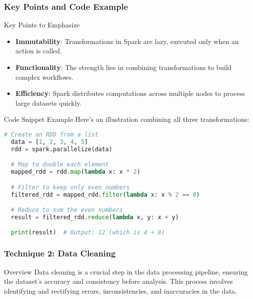\documentclass[aspectratio=169]{beamer}
\begin{document}
\begin{frame}[fragile]
  \frametitle{Key Points and Code Example}

  \begin{block}{Key Points to Emphasize}
    \begin{itemize}
      \item \textbf{Immutability}: Transformations in Spark are lazy, executed only when an action is called. 
      \item \textbf{Functionality}: The strength lies in combining transformations to build complex workflows.
      \item \textbf{Efficiency}: Spark distributes computations across multiple nodes to process large datasets quickly.
    \end{itemize}
  \end{block}

  \begin{block}{Code Snippet Example}
  Here’s an illustration combining all three transformations:
  \begin{lstlisting}[language=Python]
  # Create an RDD from a list
  data = [1, 2, 3, 4, 5]
  rdd = spark.parallelize(data)

  # Map to double each element
  mapped_rdd = rdd.map(lambda x: x * 2)

  # Filter to keep only even numbers
  filtered_rdd = mapped_rdd.filter(lambda x: x % 2 == 0)

  # Reduce to sum the even numbers
  result = filtered_rdd.reduce(lambda x, y: x + y)

  print(result)  # Output: 12 (which is 4 + 8)
  \end{lstlisting}
  \end{block}
  
\end{frame}

\begin{frame}[fragile]
    \frametitle{Technique 2: Data Cleaning}
    \begin{block}{Overview}
        Data cleaning is a crucial step in the data processing pipeline, ensuring the dataset's accuracy and consistency before analysis. This process involves identifying and rectifying errors, inconsistencies, and inaccuracies in the data.
    \end{block}
\end{frame}
\end{document}

